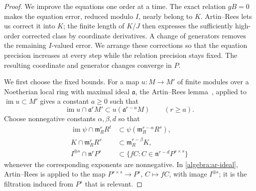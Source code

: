 \begin{proof}
We improve the equations one order at a time.  The exact relation
$gB=0$ makes the equation error, reduced modulo $I$, nearly belong to
$K$.  Artin--Rees lets us correct it into $K$; the finite length of
$K/J$ then expresses the sufficiently high-order corrected class by
coordinate derivatives.  A change of generators removes the remaining
$I$-valued error.  We arrange these corrections so that the equation
precision increases at every step while the relation precision stays
fixed.  The resulting coordinate and generator changes converge in $P$.

We first choose the fixed bounds. For a map
$u:M\to M'$ of finite modules over a Noetherian local ring with maximal
ideal $\mathfrak a$, the Artin--Rees lemma~\cite[Tag~00IN]{StacksCompletion}, applied to
$\operatorname{im}u\subset M'$ gives a constant $a\ge0$ such that
\[
 \operatorname{im}u\cap\mathfrak a^rM'
 \subset u(\mathfrak a^{r-a}M)\qquad(r\ge a).
\]
Choose nonnegative constants $\alpha,\beta,d$ so that
\begin{align}
 \operatorname{im}\psi\cap\mathfrak m_R^rR^t
 &\subset\psi(\mathfrak m_R^{r-\alpha}R^s),
 \label{algebra:ar-image}\\
 K\cap\mathfrak m_R^rR^s
 &\subset\mathfrak m_R^{r-\beta}K,
 \label{algebra:ar-kernel}\\
 I^{\oplus s}\cap\mathfrak n^rP^s
 &\subset\{fC:C\in\mathfrak n^{r-d}P^{s\times s}\}
 \label{algebra:ar-ideal}
\end{align}
whenever the corresponding exponents are nonnegative.  In
\eqref{algebra:ar-ideal}, Artin--Rees is applied to the map
$P^{s\times s}\to P^s$, $C\mapsto fC$, with image $I^{\oplus s}$; it is the
filtration induced from $P^s$ that is relevant.


\end{proof}
